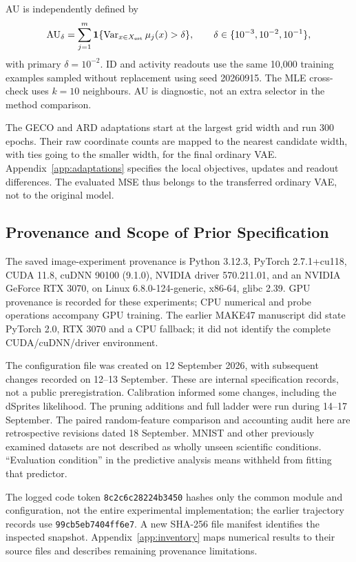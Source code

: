 \documentclass[make,article,submit,pdftex,moreauthors]{Definitions/mdpi}
\begin{document}
AU is independently defined by
\begin{equation}
 \mathrm{AU}_\delta=\sum_{j=1}^{m}
 \mathbf1\{\operatorname{Var}_{x\in X_{\rm est}}\mu_j(x)>\delta\},
 \qquad \delta\in\{10^{-3},10^{-2},10^{-1}\},
 \label{eq:au}
\end{equation}
with primary $\delta=10^{-2}$. ID and activity readouts use the same
10,000 training examples sampled without replacement using seed
20260915. The MLE cross-check uses $k=10$ neighbours. AU is diagnostic,
not an extra selector in the method comparison.

The GECO and ARD adaptations start at the largest grid width and run
300 epochs. Their raw coordinate counts are mapped to the nearest
candidate width, with ties going to the smaller width, for the final
ordinary VAE. Appendix~\ref{app:adaptations} specifies the local
objectives, updates and readout differences. The evaluated MSE thus
belongs to the transferred ordinary VAE, not to the original model.

\subsection{Provenance and Scope of Prior Specification}\label{sec:provenance}
The saved image-experiment provenance is Python 3.12.3, PyTorch
2.7.1+cu118, CUDA 11.8, cuDNN 90100 (9.1.0), NVIDIA driver 570.211.01,
and an NVIDIA GeForce RTX 3070, on Linux 6.8.0-124-generic, x86-64,
glibc 2.39. GPU provenance is recorded for these experiments; CPU
numerical and probe operations accompany GPU training. The earlier
MAKE47 manuscript did state PyTorch 2.0, RTX 3070 and a CPU fallback;
it did not identify the complete CUDA/cuDNN/driver environment.

The configuration file was created on 12 September 2026, with subsequent
changes recorded on 12--13 September. These are internal specification
records, not a public preregistration. Calibration informed some changes,
including the dSprites likelihood. The pruning additions and full ladder
were run during 14--17 September. The paired random-feature comparison
and accounting audit here are retrospective revisions dated 18 September.
MNIST and other previously examined datasets are not described as wholly
unseen scientific conditions. ``Evaluation condition'' in the predictive
analysis means withheld from fitting that predictor.

The logged code token \texttt{8c2c6c28224b3450} hashes only the common
module and configuration, not the entire experimental implementation;
the earlier trajectory records use \texttt{99cb5eb7404ff6e7}.
A new SHA-256 file manifest identifies the inspected snapshot.
Appendix~\ref{app:inventory} maps numerical results to their source files
and describes remaining provenance limitations.
\end{document}

